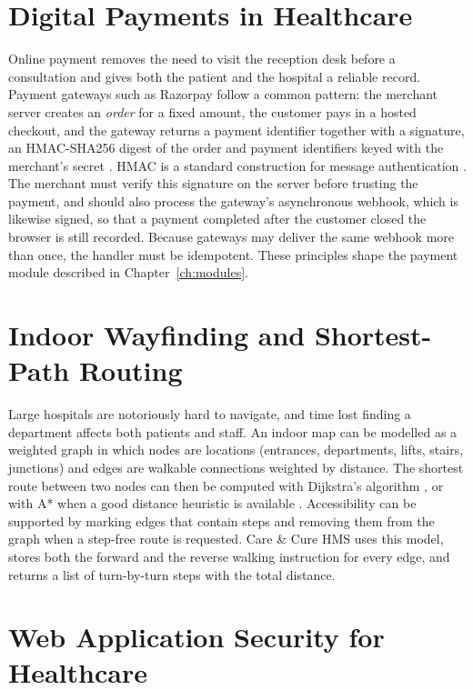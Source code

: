 \FloatBarrier
\section{Digital Payments in Healthcare}

Online payment removes the need to visit the reception desk before a consultation and gives both the patient and the hospital a reliable record. Payment gateways such as Razorpay follow a common pattern: the merchant server creates an \emph{order} for a fixed amount, the customer pays in a hosted checkout, and the gateway returns a payment identifier together with a signature, an HMAC-SHA256 digest of the order and payment identifiers keyed with the merchant's secret \cite{razorpaydocs}. HMAC is a standard construction for message authentication \cite{rfc2104}. The merchant must verify this signature on the server before trusting the payment, and should also process the gateway's asynchronous webhook, which is likewise signed, so that a payment completed after the customer closed the browser is still recorded. Because gateways may deliver the same webhook more than once, the handler must be idempotent. These principles shape the payment module described in Chapter~\ref{ch:modules}.

\FloatBarrier
\section{Indoor Wayfinding and Shortest-Path Routing}

Large hospitals are notoriously hard to navigate, and time lost finding a department affects both patients and staff. An indoor map can be modelled as a weighted graph in which nodes are locations (entrances, departments, lifts, stairs, junctions) and edges are walkable connections weighted by distance. The shortest route between two nodes can then be computed with Dijkstra's algorithm \cite{dijkstra1959}, or with A* when a good distance heuristic is available \cite{hart1968}. Accessibility can be supported by marking edges that contain steps and removing them from the graph when a step-free route is requested. Care \& Cure HMS uses this model, stores both the forward and the reverse walking instruction for every edge, and returns a list of turn-by-turn steps with the total distance.

\FloatBarrier
\section{Web Application Security for Healthcare}

